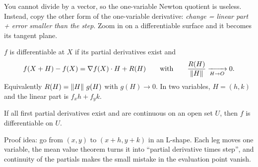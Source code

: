 \begin{intuition}
You cannot divide by a vector, so the one-variable Newton quotient is useless. Instead,
copy the other form of the one-variable derivative: \emph{change = linear part + error
smaller than the step}. Zoom in on a differentiable surface and it becomes its tangent
plane.
\end{intuition}

\begin{defi}[Differentiable at $X$]
$f$ is differentiable at $X$ if its partial derivatives exist and
\[
f(X+H)-f(X)=\nabla f(X)\cdot H+R(H)\qquad\text{with}\qquad \frac{R(H)}{\left\lVert H\right\rVert}\xrightarrow[H\to O]{}0 .
\]
Equivalently $R(H)=\left\lVert H\right\rVert\,g(H)$ with $g(H)\to0$. In two variables, $H=(h,k)$ and the
linear part is $f_xh+f_yk$.
\end{defi}

\begin{thm}
If all first partial derivatives exist and are continuous on an open set $U$, then $f$ is
differentiable on $U$.
\end{thm}

\begin{intuition}
Proof idea: go from $(x,y)$ to $(x+h,y+k)$ in an L-shape. Each leg moves one variable, the
mean value theorem turns it into ``partial derivative times step'', and continuity of the
partials makes the small mistake in the evaluation point vanish.
\end{intuition}

\begin{center}
\end{center}

